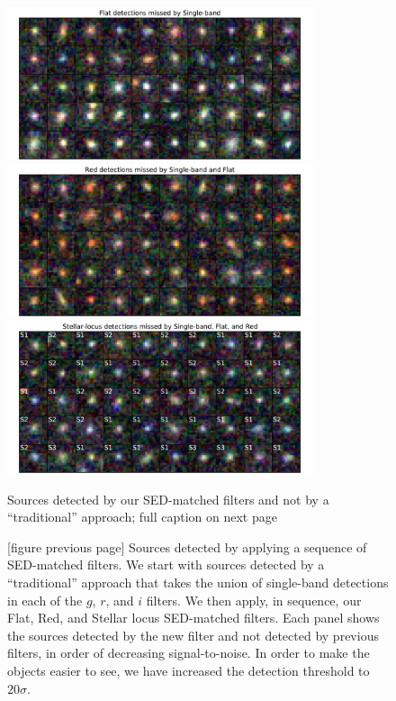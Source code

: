 \documentclass[letterpaper,preprint]{aastex62}
\begin{document}
\begin{figure}
\begin{center}
\includegraphics[width=0.8\textwidth]{mdetect-14}
\includegraphics[width=0.8\textwidth]{mdetect-15}
\includegraphics[width=0.8\textwidth]{mdetect-16}
\caption{Sources detected by our SED-matched filters and not by a
  ``traditional'' approach; full caption on next page\label{fig:missed}}
\end{center}
\end{figure}

\addtocounter{figure}{-1}
\begin{figure}
\begin{center}
\caption{[figure previous page] Sources detected by applying a
  sequence of SED-matched filters.  We start with sources detected by
  a ``traditional'' approach that takes the union of single-band
  detections in each of the $g$, $r$, and $i$ filters.  We then apply,
  in sequence, our Flat, Red, and Stellar locus SED-matched filters.
  Each panel shows the sources detected by the new filter and not
  detected by previous filters, in order of decreasing
  signal-to-noise.  In order to make the objects easier to see, we
  have increased the detection threshold to $20 \sigma$.}
\end{center}
\end{figure}
\end{document}
